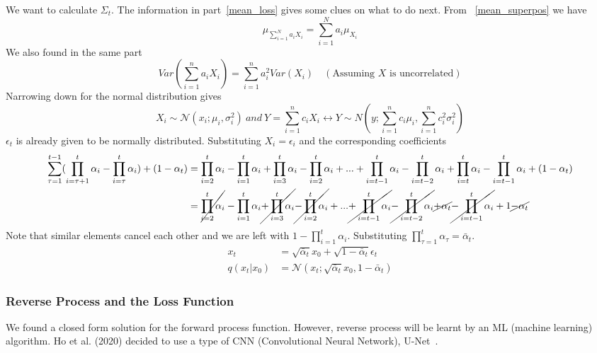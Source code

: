 \documentclass{article}
\numberwithin{equation}{subsection}
\begin{document}
We want to calculate $\Sigma_t$. The information in part~\ref{mean_loss} gives some clues on what to do next. From ~\ref{mean_superpos} we have
\begin{equation}
    \mu_{\sum_{i=1}^N a_i X_i} = \sum_{i=1}^N a_i \mu_{X_i}
\end{equation}
We also found in the same part
\begin{equation}
    Var(\sum_{i=1}^{n} a_i X_i) = \sum_{i=1}^{n} a_i^2 Var(X_i) \quad (\text{Assuming $X$ is uncorrelated})
    \label{varsum}
\end{equation}
Narrowing down for the normal distribution gives
\begin{equation}
    X_i \sim \mathcal{N}(x_i; \mu_i, \sigma_i^2)\ and\ Y = \sum_{i=1}^{n}c_iX_i \longleftrightarrow Y \sim N(y; \sum_{i=1}^{n}c_i\mu_i,\sum_{i=1}^{n}c_i^2\sigma_i^2)
\end{equation}
$\epsilon_t$ is already given to be normally distributed. Substituting $X_i = \epsilon_i$ and the corresponding coefficients 
\begin{align}
    \sum_{\tau=1}^{t-1}(\prod_{i=\tau+1}^{t}\alpha_i-\prod_{i=\tau}^{t}\alpha_i)+(1-\alpha_t) &= \prod_{i=2}^{t}\alpha_i-\prod_{i=1}^{t}\alpha_i+\prod_{i=3}^{t}\alpha_i-\prod_{i=2}^{t}\alpha_i+...+\prod_{i=t-1}^{t}\alpha_i-\prod_{i=t-2}^{t}\alpha_i+\prod_{i=t}^{t}\alpha_i-\prod_{i=t-1}^{t}\alpha_i+(1-\alpha_t)\\
    &= \cancel{\prod_{i=2}^{t}\alpha_i}-\prod_{i=1}^{t}\alpha_i\cancel{+\prod_{i=3}^{t}\alpha_i}\cancel{-\prod_{i=2}^{t}\alpha_i}+...\cancel{+\prod_{i=t-1}^{t}\alpha_i}\cancel{-\prod_{i=t-2}^{t}\alpha_i}\cancel{+\alpha_t}\cancel{-\prod_{i=t-1}^{t}\alpha_i}+1\cancel{-\alpha_t}
\end{align}
Note that similar elements cancel each other and we are left with $1-\prod_{i=1}^{t}\alpha_i$. Substituting $\prod_{\tau=1}^{t}\alpha_\tau = \bar{\alpha}_t$.
\begin{align}
    x_t &= \sqrt{\bar{\alpha}_t}x_0 + \sqrt{1 - \bar{\alpha}_t}\epsilon_t\label{reparam_xt}\\
    q(x_t|x_0) &= \mathcal{N}(x_t;\sqrt{\bar{\alpha}_t}x_0,1 - \bar{\alpha}_t)
\end{align}
\subsubsection{Reverse Process and the Loss Function}
We found a closed form solution for the forward process function. However, reverse process will be learnt by an ML (machine learning) algorithm. Ho et al. (2020) decided to use a type of CNN (Convolutional Neural Network), U-Net~\cite{ho_denoising_2020}.
\end{document}
